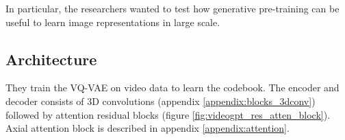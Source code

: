 In particular, the researchers wanted to test how generative pre-training can be useful to learn image representations in large scale.






\subsection{Architecture}

They train the VQ-VAE on video data to learn the codebook. The encoder and decoder consists of 3D convolutions (appendix \ref{appendix:blocks_3dconv}) followed by attention residual blocks (figure \ref{fig:videogpt_res_atten_block}). Axial attention \cite{axial_attention} block is described in appendix \ref{appendix:attention}.
